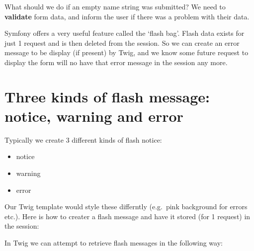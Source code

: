 \documentclass[a4paperpaper,openright]{book}
\newenvironment{Shaded}{}{}
\newcommand{\KeywordTok}[1]{\textcolor[rgb]{0.00,0.44,0.13}{\textbf{#1}}}
\newcommand{\NormalTok}[1]{#1}
\newcommand{\OtherTok}[1]{\textcolor[rgb]{0.00,0.44,0.13}{#1}}
\newcommand{\StringTok}[1]{\textcolor[rgb]{0.25,0.44,0.63}{#1}}
\providecommand{\tightlist}{%
  \setlength{\itemsep}{0pt}\setlength{\parskip}{0pt}}
\begin{document}
What should we do if an empty name string was submitted? We need to
\textbf{validate} form data, and inform the user if there was a problem
with their data.

Symfony offers a very useful feature called the `flash bag'. Flash data
exists for just 1 request and is then deleted from the session. So we
can create an error message to be display (if present) by Twig, and we
know some future request to display the form will no have that error
message in the session any more.

\hypertarget{three-kinds-of-flash-message-notice-warning-and-error}{%
\section{Three kinds of flash message: notice, warning and
error}\label{three-kinds-of-flash-message-notice-warning-and-error}}

Typically we create 3 different kinds of flash notice:

\begin{itemize}
\tightlist
\item
  notice
\item
  warning
\item
  error
\end{itemize}

Our Twig template would style these differntly (e.g.~pink background for
errors etc.). Here is how to creater a flash message and have it stored
(for 1 request) in the session:

\begin{Shaded}
\end{Shaded}

In Twig we can attempt to retrieve flash messages in the following way:

\begin{Shaded}
\end{Shaded}
\end{document}
